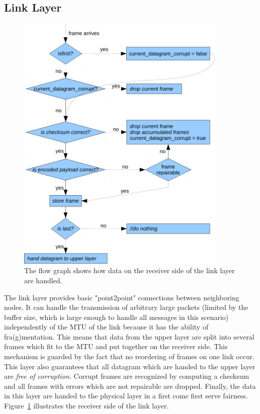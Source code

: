 \subsection{Link Layer}
\begin{figure}
  \centering
  \includegraphics[width=0.9\textwidth]{images/flowgraph_link_layer_receiver.pdf}
  \caption[Receiver side of link layer]{ The flow graph shows how data on the receiver side of the link layer are handled.}
  \label{fig:receiver-side-link-layer}
\end{figure}
The link layer provides basic "point2point" connections between neighboring nodes. It can handle the transmission of arbitrary large packets (limited by the buffer size, which is large enough to handle all messages in this scenario) independently of the MTU of the link because it has the ability of fra(g)mentation. This means that data from the upper layer are split into several frames which fit to the MTU and put together on the receiver side. This mechanism is guarded by the fact that no reordering of frames on one link occur. This layer also guarantees that all datagram which are handed to the upper layer are \emph{free of corruption}. Corrupt frames are recognized by computing a checksum and all frames with errors which are not repairable are dropped.  Finally, the data in this layer are handed to the physical layer in a first come first serve fairness. Figure~\ref{fig:receiver-side-link-layer} illustrates the receiver side of the link layer.


